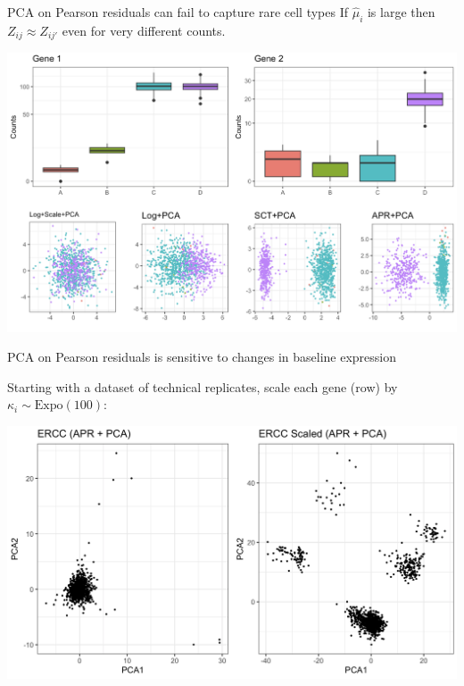 \documentclass[aspectratio=43]{beamer}
\begin{document}
\begin{frame}{PCA on Pearson residuals can fail to capture rare cell types}
If $\hat{\mu}_i$ is large then $Z_{ij} \approx Z_{ij'}$ even for very different counts.

\vspace{2em}

\centering
\includegraphics[scale=0.17]{Fig/single_marker_pca.png}
\end{frame}

\begin{frame}{PCA on Pearson residuals is sensitive to changes in baseline expression}

Starting with a dataset of technical replicates, scale each gene (row) by $\kappa_i \sim \text{Expo}(100)$:

\centering 
\includegraphics[scale=0.15]{Fig/ercc_scaled_pca.png}

\end{frame}
\end{document}
